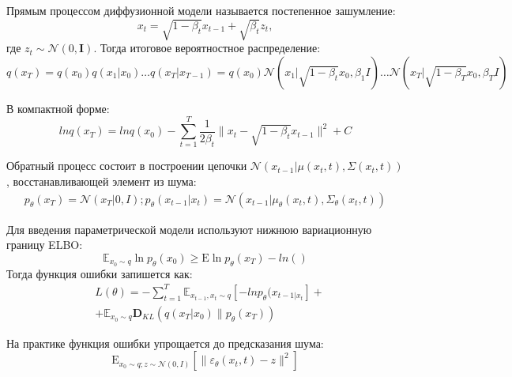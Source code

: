 Прямым процессом диффузионной модели называется постепенное зашумление:
\begin{equation}
    x_t = \sqrt{1-\beta_t} x_{t-1} + \sqrt{\beta_t} z_t,
\end{equation}
где $z_t \sim \mathcal{N}(0,\mathbf{I})$. 
Тогда итоговое вероятностное распределение:
\begin{equation}
    q(x_{T}) = q(x_0)q(x_1|x_0) \dots q(x_T|x_{T-1}) =
    q(x_0) \mathcal{N}(x_1|\sqrt{1-\beta_t}x_0,\beta_1I)\dots
    \mathcal{N}(x_T|\sqrt{1-\beta_T}x_0,\beta_TI)
\end{equation}

В компактной форме:
\begin{equation}
    ln q(x_{T}) = ln q(x_0) - \sum_{t=1}^T \frac{1}{2\beta_t} \| x_t - \sqrt{1-\beta_t} x_{t-1} \|^2 + C
\end{equation}

Обратный процесс состоит в построении цепочки 
$\mathcal{N}(x_{t-1}|\mu(x_t,t),\Sigma(x_t,t))$, восстанавливающей элемент из шума:
\begin{equation}
    \begin{aligned}
        p_\theta(x_T) = \mathcal{N}(x_T|0,I);
        p_\theta(x_{t-1}|x_t) = \mathcal{N}(x_{t-1}|\mu_\theta(x_t,t), \Sigma_\theta(x_t,t))
    \end{aligned}
\end{equation}

Для введения параметрической модели используют нижнюю вариационную границу ELBO:
\begin{equation}
    \mathbb{E}_{x_0 \sim q} \ln p_\theta(x_0) \ge \mathrm{E} \ln p_\theta(x_T) - ln()
\end{equation}
Тогда функция ошибки запишется как:
\begin{equation}
    \begin{aligned}
        &L(\theta) = - \sum_{t=1}^T\mathbb{E}_{x_{t-1},x_t \sim q} \left[-ln p_\theta(x_{t-1|x_t}\right] + \\
        &+ \mathbb{E}_{x_0 \sim q} \mathbf{D}_{KL}(q(x_T|x_0) \parallel p_\theta (x_T))
    \end{aligned}
\end{equation}

На практике функция ошибки упрощается до предсказания шума:
\begin{equation}
    \mathrm{E}_{x_0 \sim q; z\sim \mathcal{N}(0,I)} 
    \left[ \| \varepsilon_\theta(x_t,t) -z \|^2\right]
\end{equation}


